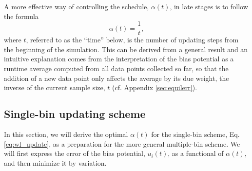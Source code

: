 \documentclass[reprint, superscriptaddress, floatfix]{revtex4-1}
\begin{document}
A more effective way
of controlling the schedule, $\alpha(t)$,
in late stages
is to follow the formula
%
\begin{equation}
  \alpha(t) = \frac{1}{t},
  \label{eq:alpha_invt}
\end{equation}
%
where $t$,
referred to as the ``time'' below,
is the number of updating steps
from the beginning of the simulation\cite{
belardinelli2007, *belardinelli2007jcp, *belardinelli2008, *belardinelli2016,
morozov2007, zhou2008,
komura2012, *caparica2012, *caparica2014}.
%
This can be derived from a general result\cite{
  robbins1951, pellegrini2014}
and an intuitive explanation\cite{
  marsili2006, barducci2008}
comes from the interpretation of
the bias potential %
as a runtime average computed from all data points collected so far,
so that the addition of a new data point only
affects the average by its due weight,
the inverse of the current sample size, $t$
(cf. Appendix \ref{sec:equilerr}).
%

%






\subsection{\label{sec:single-bin}
Single-bin updating scheme}



In this section,
we will derive the optimal $\alpha(t)$
for the single-bin scheme,
Eq. \eqref{eq:wl_update},
as a preparation
for the more general multiple-bin scheme.
%
%
We will first express the error of
the bias potential, $u_i(t)$,
as a functional of $\alpha(t)$,
and then minimize it by variation.
%
\end{document}
